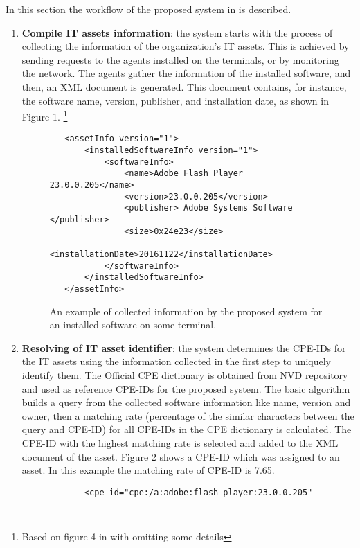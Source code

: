 \documentclass{llncs}
\begin{document}
\begin{flushleft}
In this section the workflow of the proposed system in \cite{paper1} is described.
 \end{flushleft}
\begin{enumerate}
 \item \textbf{Compile IT assets information}: the system starts with the process of collecting the information of the organization's IT assets. This is achieved by sending requests to the agents installed on the terminals, or by monitoring the network. The agents gather the information of the installed software, and then, an XML document is generated. This document contains, for instance, the software name, version, publisher, and installation date, as shown in Figure 1.  \footnote{Based on figure 4 in \cite{paper1} with omitting some details} 

 \begin{figure}
 \centering
   \lstset{language=XML}
    \begin{lstlisting}
   <assetInfo version="1">
       <installedSoftwareInfo version="1">
           <softwareInfo>
               <name>Adobe Flash Player 23.0.0.205</name>
               <version>23.0.0.205</version>
               <publisher> Adobe Systems Software </publisher>
               <size>0x24e23</size>
               <installationDate>20161122</installationDate>
           </softwareInfo>
       </installedSoftwareInfo>
   </assetInfo>
    \end{lstlisting}
   \caption{An example of collected information by the proposed system for an installed software on some terminal.}
    \end{figure}
   
   \item \textbf{Resolving of IT asset identifier}: the system determines the CPE-IDs for the IT assets using the information  collected in the first step to uniquely identify them. The Official CPE dictionary is obtained from NVD repository and used as reference CPE-IDs for the proposed system. The basic algorithm builds a query from the collected software information like name, version and owner, then a matching rate (percentage of the similar characters between the query and CPE-ID) for all CPE-IDs in the CPE dictionary is calculated.  The CPE-ID with the highest matching rate is selected and added to the XML document of the asset. Figure 2 shows a CPE-ID which was assigned to an asset. In this example the matching rate of CPE-ID is 7.65.
   
    \begin{figure}
    \centering
      \lstset{language=XML}
       \begin{lstlisting} 
       <cpe id="cpe:/a:adobe:flash_player:23.0.0.205"
       

\end{lstlisting}
\end{figure}
\end{enumerate}
\end{document}
